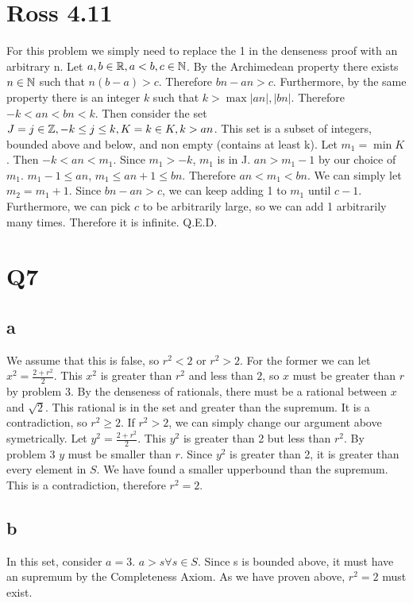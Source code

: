 \documentclass[12pt]{article}
\begin{document}
\section{Ross 4.11}
For this problem we simply need to replace the 1 in the denseness proof with an arbitrary n.
\newline
Let $a,b \in \mathbb{R}, a < b, c \in \mathbb{N}$. By the Archimedean property there exists $n \in \mathbb{N}$ such that $n(b-a)>c$. Therefore $bn - an > c$. Furthermore, by the same property there is an integer $k$ such that $k > \max{|an|, |bn|}$. Therefore $-k < an < bn < k$.
\newline
Then consider the set $J ={j \in \mathbb{Z}, -k \leq j \leq k}, K = {k \in K, k > an}$. This set is a subset of integers, bounded above and below, and non empty (contains at least k). Let $m_1 = \min K$. Then $-k < an < m_1$. Since $m_1 > -k$, $m_1$ is in J. $an > m_1-1$ by our choice of $m_1$.  $m_1-1 \leq an$, $m_1 \leq an+1 \leq bn$. Therefore $an < m_1 < bn$. We can simply let $m_2 = m_1 + 1$. Since $bn - an > c$, we can keep adding 1 to $m_1$ until $c-1$. Furthermore, we can pick $c$ to be arbitrarily large, so we can add 1 arbitrarily many times. Therefore it is infinite.
\newline
Q.E.D.

\newpage
\section{Q7}

\subsection{a}
We assume that this is false, so $r^2 < 2$ or $r^2 > 2$. For the former we can let $x^2 = \frac{2+r^2}{2}$. This $x^2$ is greater than $r^2$ and less than $2$, so $x$ must be greater than $r$ by problem 3. By the denseness of rationals, there must be a rational between $x$ and $\sqrt 2$. This rational is in the set and greater than the supremum. It is a contradiction, so $r^2 \geq 2$.
\newline
If $r^2>2$, we can simply change our argument above symetrically. Let $y^2 = \frac{2+r^2}{2}$. This $y^2$ is greater than 2 but less than $r^2$. By problem 3 $y$ must be smaller than $r$. Since $y^2$ is greater than 2, it is greater than every element in $S$. We have found a smaller upperbound than the supremum. This is a contradiction, therefore $r^2 = 2$.

\subsection{b}
In this set, consider $a = 3$. $a > s \forall s \in S$. Since s is bounded above, it must have an supremum by the Completeness Axiom. As we have proven above, $r^2 = 2$ must exist.
\end{document}
